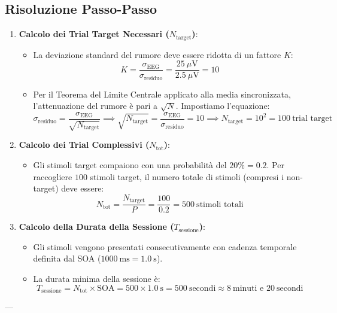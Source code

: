 \documentclass[10pt, letterpaper]{report}
\begin{document}
\subsection*{Risoluzione Passo-Passo}
\begin{enumerate}
    \item \textbf{Calcolo dei Trial Target Necessari ($N_{\text{target}}$)}:
    \begin{itemize}
        \item La deviazione standard del rumore deve essere ridotta di un fattore $K$:
        \[
        K = \frac{\sigma_{\text{EEG}}}{\sigma_{\text{residuo}}} = \frac{25\ \mu\text{V}}{2.5\ \mu\text{V}} = 10
        \]
        \item Per il Teorema del Limite Centrale applicato alla media sincronizzata, l'attenuazione del rumore è pari a $\sqrt{N}$. Impostiamo l'equazione:
        \[
        \sigma_{\text{residuo}} = \frac{\sigma_{\text{EEG}}}{\sqrt{N_{\text{target}}}} \implies \sqrt{N_{\text{target}}} = \frac{\sigma_{\text{EEG}}}{\sigma_{\text{residuo}}} = 10 \implies N_{\text{target}} = 10^2 = 100\ \text{trial target}
        \]
    \end{itemize}
    \item \textbf{Calcolo dei Trial Complessivi ($N_{\text{tot}}$)}:
    \begin{itemize}
        \item Gli stimoli target compaiono con una probabilità del $20\% = 0.2$. Per raccogliere $100$ stimoli target, il numero totale di stimoli (compresi i non-target) deve essere:
        \[
        N_{\text{tot}} = \frac{N_{\text{target}}}{P} = \frac{100}{0.2} = 500\ \text{stimoli totali}
        \]
    \end{itemize}
    \item \textbf{Calcolo della Durata della Sessione ($T_{\text{sessione}}$)}:
    \begin{itemize}
        \item Gli stimoli vengono presentati consecutivamente con cadenza temporale definita dal SOA ($1000\ \text{ms} = 1.0\ \text{s}$).
        \item La durata minima della sessione è:
        \[
        T_{\text{sessione}} = N_{\text{tot}} \times \text{SOA} = 500 \times 1.0\ \text{s} = 500\ \text{secondi} \approx 8\ \text{minuti e } 20\ \text{secondi}
        \]
    \end{itemize}
\end{enumerate}

---
\end{document}
